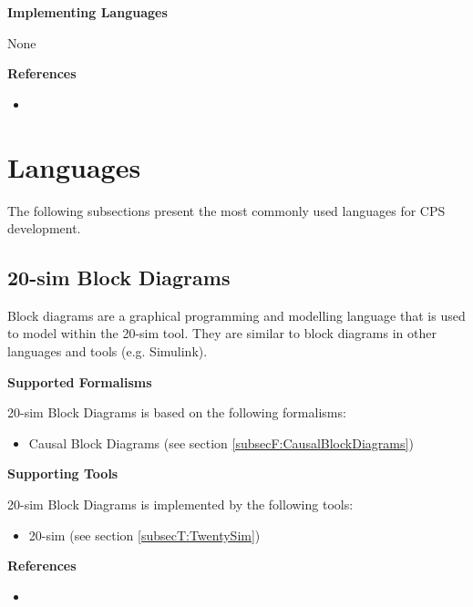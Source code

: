 \textbf{Implementing Languages}

None





\textbf{References}
\begin{itemize}
	
\item {}
\end{itemize}
\section{Languages}
\label{sec:languages}

The following subsections present the most commonly used languages for CPS development.

\subsection{20-sim Block Diagrams}
\label{subsecL:TwentySimBlockDiagram}


Block diagrams are a graphical programming and modelling language that is used to model within the 20-sim tool. They are similar to block diagrams in other languages and tools (e.g. Simulink).

\textbf{Supported Formalisms}

20-sim Block Diagrams is based on the following formalisms:
\begin{itemize}
	\item Causal Block Diagrams (see section \ref{subsecF:CausalBlockDiagrams})
\end{itemize}


\textbf{Supporting Tools}

20-sim Block Diagrams is implemented by the following tools:
\begin{itemize}
	\item 20-sim (see section \ref{subsecT:TwentySim})
\end{itemize}


\textbf{References}
\begin{itemize}
	
\item {}
\end{itemize}



